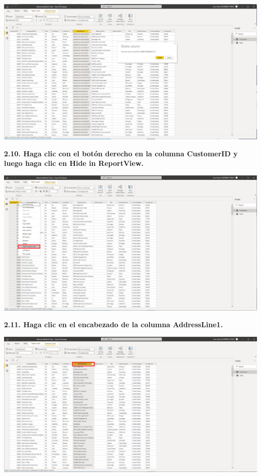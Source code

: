 \documentclass{article}
\begin{document}
    \begin{center}
		\includegraphics[width=14cm]{./images/22} 
	\end{center}
	
\textbf{2.10. Haga clic con el botón derecho en la columna \textbf{CustomerID} y luego haga clic en \textbf{Hide in ReportView}.}

    \begin{center}
		\includegraphics[width=14cm]{./images/23} 
	\end{center}
\newpage	
\textbf{2.11. Haga clic en el encabezado de la columna \textbf{AddressLine1}.}

    \begin{center}
		\includegraphics[width=14cm]{./images/24} 
	\end{center}
	
\end{document}
